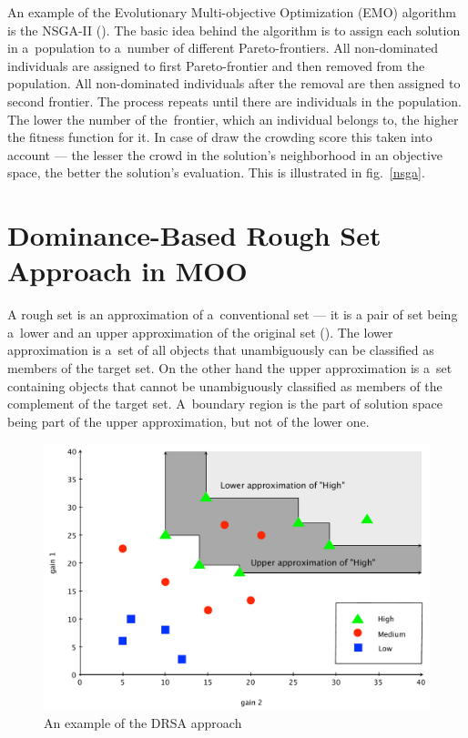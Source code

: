 An example of the Evolutionary Multi-objective Optimization (EMO) algorithm is
the NSGA-II (\cite{Deb00}). The basic idea behind the algorithm is to assign
each solution in a~population to a~number of different Pareto-frontiers. All
non-dominated individuals are assigned to first Pareto-frontier and then
removed from the population. All non-dominated individuals after the removal
are then assigned to second frontier. The process repeats until there are
individuals in the population. The lower the number of the~frontier, which an
individual belongs to, the higher the fitness function for it. In case of draw
the crowding score this taken into account --- the lesser the crowd in the
solution's neighborhood in an objective space, the better the solution's
evaluation. This is illustrated in fig.~\ref{nsga}.


\section{Dominance-Based Rough Set Approach in MOO}
\label{sec_drsa_in_moo}

A rough set is an approximation of a~conventional set --- it is a pair of set
being a~lower and an upper approximation of the original set
(\cite{Paw82}). The lower approximation is a~set of all objects that
unambiguously can be classified as members of the target set. On the other
hand the upper approximation is a~set containing objects that cannot be
unambiguously classified as members of the complement of the target set.
A~boundary region is the part of solution space being part of the upper
approximation, but not of the lower one.

\begin{figure}
  \centering \includegraphics[scale=0.5]{img/drsa}
  \caption{An example of the DRSA approach}
  \label{drsa}
\end{figure}

